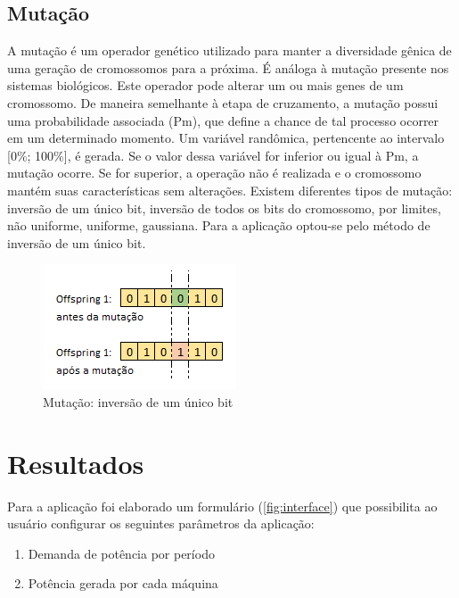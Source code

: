 \documentclass[twoside]{article}
\begin{document}
\begin{multicols}{2}
\subsection{Mutação}
A mutação é um operador genético utilizado para manter a diversidade gênica de uma geração de cromossomos para a próxima. É análoga à mutação presente nos sistemas biológicos. Este operador pode alterar um ou mais genes de um cromossomo. De maneira semelhante à etapa de cruzamento, a mutação possui uma probabilidade associada (Pm), que define a chance de tal processo ocorrer em um determinado momento. Um variável randômica, pertencente ao intervalo [0\%; 100\%], é gerada. Se o valor dessa variável for inferior ou igual à Pm, a mutação ocorre. Se for superior, a operação não é realizada e o cromossomo mantém suas características sem alterações.
Existem diferentes tipos de mutação: inversão de um único bit, inversão de todos os bits do cromossomo, por limites, não uniforme, uniforme, gaussiana. Para a aplicação optou-se pelo método de inversão de um único bit.

\begin{figure}[H]
\label{fig:mut}
  \caption{Mutação: inversão de um único bit}
  \centering
    \includegraphics[scale = 0.9]{mutation.png}
\end{figure}


\section{Resultados}
Para a aplicação foi elaborado um formulário (\ref {fig:interface}) que possibilita ao usuário configurar os seguintes parâmetros da aplicação:
\begin{enumerate}
\item Demanda de potência por período
\item Potência gerada por cada máquina
\end{enumerate}


\end{multicols}
\end{document}
